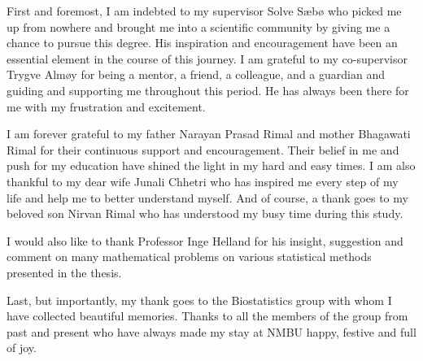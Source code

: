 First and foremost, I am indebted to my supervisor Solve Sæbø who picked
me up from nowhere and brought me into a scientific community by giving
me a chance to pursue this degree. His inspiration and encouragement
have been an essential element in the course of this journey. I am
grateful to my co-supervisor Trygve Almøy for being a mentor, a friend,
a colleague, and a guardian and guiding and supporting me throughout
this period. He has always been there for me with my frustration and
excitement.

I am forever grateful to my father Narayan Prasad Rimal and mother
Bhagawati Rimal for their continuous support and encouragement. Their
belief in me and push for my education have shined the light in my hard
and easy times. I am also thankful to my dear wife Junali Chhetri who
has inspired me every step of my life and help me to better understand
myself. And of course, a thank goes to my beloved son Nirvan Rimal who
has understood my busy time during this study.

I would also like to thank Professor Inge Helland for his insight,
suggestion and comment on many mathematical problems on various
statistical methods presented in the thesis.

Last, but importantly, my thank goes to the Biostatistics group with
whom I have collected beautiful memories. Thanks to all the members of
the group from past and present who have always made my stay at NMBU
happy, festive and full of joy.
